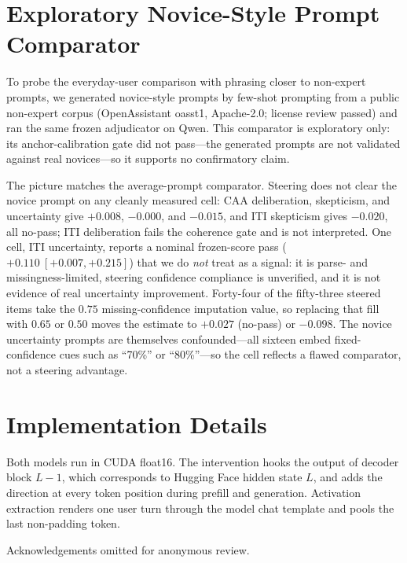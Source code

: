 \documentclass[manuscript,review,anonymous]{acmart}
\begin{document}
\section{Exploratory Novice-Style Prompt Comparator}\label{app-novice}

To probe the everyday-user comparison with phrasing closer to non-expert prompts, we generated novice-style prompts by few-shot prompting from a public non-expert corpus (OpenAssistant oasst1, Apache-2.0; license review passed) and ran the same frozen adjudicator on Qwen. This comparator is exploratory only: its anchor-calibration gate did not pass---the generated prompts are not validated against real novices---so it supports no confirmatory claim. {}%

The picture matches the average-prompt comparator. Steering does not clear the novice prompt on any cleanly measured cell: CAA deliberation, skepticism, and uncertainty give \(+0.008\), \(-0.000\), and \(-0.015\), and ITI skepticism gives \(-0.020\), all no-pass; ITI deliberation fails the coherence gate and is not interpreted. One cell, ITI uncertainty, reports a nominal frozen-score pass (\(+0.110\ [+0.007,+0.215]\)) that we do \emph{not} treat as a signal: it is parse- and missingness-limited, steering confidence compliance is unverified, and it is not evidence of real uncertainty improvement. Forty-four of the fifty-three steered items take the \(0.75\) missing-confidence imputation value, so replacing that fill with \(0.65\) or \(0.50\) moves the estimate to \(+0.027\) (no-pass) or \(-0.098\). The novice uncertainty prompts are themselves confounded---all sixteen embed fixed-confidence cues such as ``70\%'' or ``80\%''---so the cell reflects a flawed comparator, not a steering advantage.

\section{Implementation Details}\label{app-impl}

Both models run in CUDA float16. The intervention hooks the output of decoder block \(L-1\), which corresponds to Hugging Face hidden state \(L\), and adds the direction at every token position during prefill and generation. Activation extraction renders one user turn through the model chat template and pools the last non-padding token.

\begin{acks}
Acknowledgements omitted for anonymous review.
\end{acks}



\end{document}
